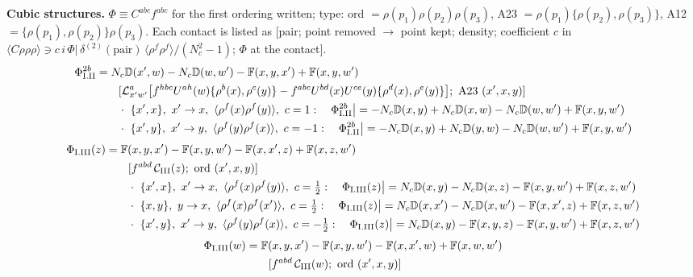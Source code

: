 \documentclass[9pt]{article}
\def\mf#1{\mathbb{#1}}
\numberwithin{equation}{section}
\begin{document}
{\noindent\textbf{Cubic structures.} $\Phi\equiv C^{abc}f^{abc}$ for the first ordering written; type: ord $=\rho(p_{1})\rho(p_{2})\rho(p_{3})$, A23 $=\rho(p_{1})\{\rho(p_{2}),\rho(p_{3})\}$, A12 $=\{\rho(p_{1}),\rho(p_{2})\}\rho(p_{3})$. Each contact is listed as [pair; point removed $\to$ point kept; density; coefficient $c$ in $\langle C\rho\rho\rho\rangle\ni c\,i\,\Phi|\,\delta^{(2)}(\text{pair})\,\langle\rho^{f}\rho^{f}\rangle/(N_{c}^{2}-1)$; $\Phi$ at the contact].
\begin{align}
\Phi_{\rm I.II}^{2b}&=N_{c}\mf{D}(x',w)-N_{c}\mf{D}(w,w')-\mf{F}(x,y,x')+\mf{F}(x,y,w')\notag\\&\qquad[\mathcal{L}^{a}_{x'w'}\big[f^{hbc}U^{ah}(w)\{\rho^{b}(x),\rho^{c}(y)\}-f^{abc}U^{bd}(x)U^{ce}(y)\{\rho^{d}(x),\rho^{e}(y)\}\big];\ \text{A23}\ (x',x,y)]\notag\\
&\qquad\cdot\ \{x',x\},\ x'\to x,\ \langle\rho^{f}(x)\rho^{f}(y)\rangle,\ c=1:\quad \Phi_{\rm I.II}^{2b}\big|=-N_{c}\mf{D}(x,y)+N_{c}\mf{D}(x,w)-N_{c}\mf{D}(w,w')+\mf{F}(x,y,w')\notag\\
&\qquad\cdot\ \{x',y\},\ x'\to y,\ \langle\rho^{f}(y)\rho^{f}(x)\rangle,\ c=-1:\quad \Phi_{\rm I.II}^{2b}\big|=-N_{c}\mf{D}(x,y)+N_{c}\mf{D}(y,w)-N_{c}\mf{D}(w,w')+\mf{F}(x,y,w')\notag
\end{align}
\begin{align}
\Phi_{\rm I.III}(z)&=\mf{F}(x,y,x')-\mf{F}(x,y,w')-\mf{F}(x,x',z)+\mf{F}(x,z,w')\notag\\&\qquad[f^{abd}\,\mathcal{C}_{\rm III}(z);\ \text{ord}\ (x',x,y)]\notag\\
&\qquad\cdot\ \{x',x\},\ x'\to x,\ \langle\rho^{f}(x)\rho^{f}(y)\rangle,\ c=\tfrac{1}{2}:\quad \Phi_{\rm I.III}(z)\big|=N_{c}\mf{D}(x,y)-N_{c}\mf{D}(x,z)-\mf{F}(x,y,w')+\mf{F}(x,z,w')\notag\\
&\qquad\cdot\ \{x,y\},\ y\to x,\ \langle\rho^{f}(x)\rho^{f}(x')\rangle,\ c=\tfrac{1}{2}:\quad \Phi_{\rm I.III}(z)\big|=N_{c}\mf{D}(x,x')-N_{c}\mf{D}(x,w')-\mf{F}(x,x',z)+\mf{F}(x,z,w')\notag\\
&\qquad\cdot\ \{x',y\},\ x'\to y,\ \langle\rho^{f}(y)\rho^{f}(x)\rangle,\ c=-\tfrac{1}{2}:\quad \Phi_{\rm I.III}(z)\big|=N_{c}\mf{D}(x,y)-\mf{F}(x,y,z)-\mf{F}(x,y,w')+\mf{F}(x,z,w')\notag
\end{align}
\begin{align}
\Phi_{\rm I.III}(w)&=\mf{F}(x,y,x')-\mf{F}(x,y,w')-\mf{F}(x,x',w)+\mf{F}(x,w,w')\notag\\&\qquad[f^{abd}\,\mathcal{C}_{\rm III}(w);\ \text{ord}\ (x',x,y)]\notag\\

\end{align}}
\end{document}
